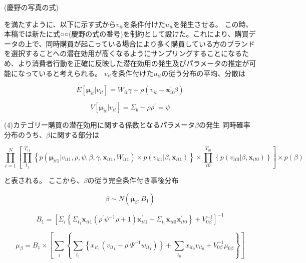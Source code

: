 \documentclass[11pt]{jsarticle}
\begin{document}
(慶野の写真の式)

を満たすように、以下に示す式から$v_{it}$を条件付けた$u_{it}$を発生させる。
この時、本稿では新たに式○○(慶野の式の番号)を制約として設けた。これにより、購買データの上で、同時購買が起こっている場合により多く購買している方のブランドを選択することへの潜在効用が高くなるようにサンプリングすることになるため、より消費者行動を正確に反映した潜在効用の発生及びパラメータの推定が可能になっていると考えられる。
$v_{it}$を条件付けた$u_{it}$の従う分布の平均、分散は

\begin{equation}\label{formula35}
E[{\boldsymbol\mu}_{it}|v_{it}]=W_{it}\gamma+\rho(v_{it}-\textbf{x}_{it}^{'}\beta)
\end{equation}

\begin{equation}\label{formula36}
V[{\boldsymbol\mu}_{it}|v_{it}]=\Sigma_{b}-\rho\rho^{'}=\psi
\end{equation}

(4)カテゴリー購買の潜在効用に関する係数となるパラメータ$\beta$の発生
同時確率分布のうち、$\beta$に関する部分は

\begin{equation}\label{formula41}
\prod_{i=1}^{N}\left[
 \prod_{t_{1}}^{T_{i1}}\left\{
  p({\boldsymbol\mu}_{it1}|v_{it1},\rho,\psi,\beta,\gamma,\textbf{x}_{it1},W_{it1})
  ×p(v_{it1}|\beta,\textbf{x}_{it1})
 \right\}
 ×\prod_{t0}^{T_{i0}}\left\{
  p(v_{it0}|\beta,\textbf{x}_{it0})
 \right\}
\right]
×p(\beta)
\end{equation}

と表される。
ここから、$\beta$の従う完全条件付き事後分布

\begin{equation}\label{formula42}
\beta \sim N({\boldsymbol\mu}_{\beta},B_{1})
\end{equation}

\begin{equation}\label{formula43}
B_{1} = \left[
 \Sigma_{i}\left\{
  \Sigma_{t_{1}}\textbf{x}_{it1}(\rho^{'}\psi^{-1}\rho+1)\textbf{x}_{it1}^{'}
  +\Sigma_{t_{0}}\textbf{x}_{it0}\textbf{x}_{it0}^{'}
 \right\}
 +V_{0\beta}^{-1}
\right]^{-1}
\end{equation}

\begin{equation} \label{formula44}
\mu_{\beta} = B_{1} \times
\left[
\sum_{\substack{i}}
\left\{
\sum_{\substack{t_{1}}}
\left\{
x_{it_{1}} (v_{it_{1}} - \rho^{\prime} \Psi^{-1} w_{it_{1}})
\right\} + \sum_{\substack{t_{0}}} x_{it_{0}} v_{it_{0}} + V^{-1}_{0\beta} \mu_{0\beta}
\right\}
\right]
\end{equation}
\end{document}
